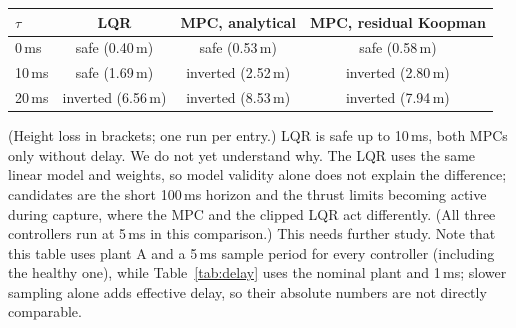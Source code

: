 \begin{center}\small
\begin{tabular}{lccc}
\toprule
$\tau$ & LQR & MPC, analytical & MPC, residual Koopman \\
\midrule
0\,ms & safe (0.40\,m) & safe (0.53\,m) & safe (0.58\,m) \\
10\,ms & safe (1.69\,m) & inverted (2.52\,m) & inverted (2.80\,m) \\
20\,ms & inverted (6.56\,m) & inverted (8.53\,m) & inverted (7.94\,m) \\
\bottomrule
\end{tabular}
\end{center}
(Height loss in brackets; one run per entry.) LQR is safe up to 10\,ms, both MPCs only without delay. We do not yet understand why. The LQR uses the same linear model and weights, so model validity alone does not explain the difference; candidates are the short 100\,ms horizon and the thrust limits becoming active during capture, where the MPC and the clipped LQR act differently. (All three controllers run at 5\,ms in this comparison.) This needs further study. Note that this table uses plant A and a 5\,ms sample period for every controller (including the healthy one), while Table~\ref{tab:delay} uses the nominal plant and 1\,ms; slower sampling alone adds effective delay, so their absolute numbers are not directly comparable.
